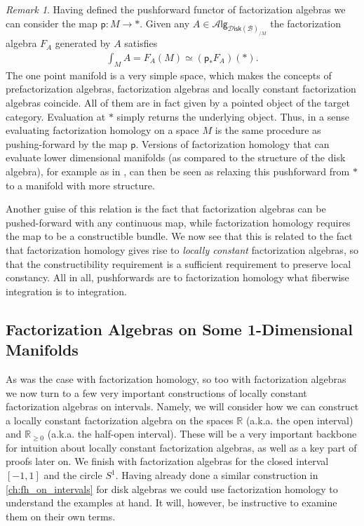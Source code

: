 \documentclass[12pt,a4paper]{article}
\newcounter{counter} \numberwithin{counter}{section}
\theoremstyle{definition}
\theoremstyle{plain}
\theoremstyle{remark}
\newtheorem{remark}[counter]{Remark}
\newcommand{\disk}{\mathscr{D} \mathsf{isk}}
\newcommand{\alg}[1]{\mathscr{A} \mathsf{lg}_{#1}}
\newcommand{\hoint}{\mathbb{R}_{\geq 0}}
\newcommand{\bstr}{\mathscr{B}}
\begin{document}
\begin{remark}\label{rem:fh_is_pushingforward}
    Having defined the pushforward functor of factorization algebras we can consider the map $\mathsf{p}:M \rightarrow *$. Given any $A \in \alg{\disk(\bstr)_{/M}}$ the factorization algebra $F_A$ generated by $A$ satisfies
    \begin{align}
        \int_M A  = F_A(M) \simeq (\mathsf{p}_* F_A)(*).
    \end{align}
    The one point manifold is a very simple space, which makes the concepts of prefactorization algebras, factorization algebras and locally constant factorization algebras coincide. All of them are in fact given by a pointed object of the target category. Evaluation at $*$ simply returns the underlying object. Thus, in a sense evaluating factorization homology on a space $M$ is the same procedure as pushing-forward by the map $\mathsf{p}$. Versions of factorization homology that can evaluate lower dimensional manifolds (as compared to the structure of the disk algebra), for example as in \cite[cor.2.29]{aft_fhstrat}, can then be seen as relaxing this pushforward from $*$ to a manifold with more structure.

    Another guise of this relation is the fact that factorization algebras can be pushed-forward with any continuous map, while factorization homology requires the map to be a constructible bundle. We now see that this is related to the fact that factorization homology gives rise to \emph{locally constant} factorization algebras, so that the constructibility requirement is a sufficient requirement to preserve local constancy. All in all, pushforwards are to factorization homology what fiberwise integration is to integration.
\end{remark} 





\subsection{Factorization Algebras on Some 1-Dimensional Manifolds}

As was the case with factorization homology, so too with factorization algebras we now turn to a few very important constructions of locally constant factorization algebras on intervals. Namely, we will consider how we can construct a locally constant factorization algebra on the spaces $\mathbb{R}$ (a.k.a. the open interval) and $\hoint$ (a.k.a. the half-open interval). These will be a very important backbone for intuition about locally constant factorization algebras, as well as a key part of proofs later on. We finish with factorization algebras for the closed interval $[-1,1]$ and the circle $S^1$. Having already done a similar construction in \cref{ch:fh_on_intervals} for disk algebras we could use factorization homology to understand the examples at hand. It will, however, be instructive to examine them on their own terms.
\end{document}
